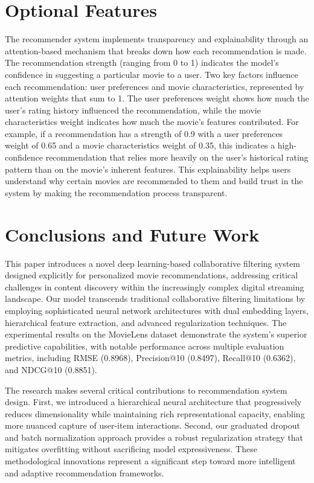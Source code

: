 \documentclass[sigconf]{acmart}
\begin{document}
\section{Optional Features}
The recommender system implements transparency and explainability through an attention-based mechanism that breaks down how each recommendation is made. The recommendation strength (ranging from 0 to 1) indicates the model's confidence in suggesting a particular movie to a user. Two key factors influence each recommendation: user preferences and movie characteristics, represented by attention weights that sum to 1. The user preferences weight shows how much the user's rating history influenced the recommendation, while the movie characteristics weight indicates how much the movie's features contributed. For example, if a recommendation has a strength of 0.9 with a user preferences weight of 0.65 and a movie characteristics weight of 0.35, this indicates a high-confidence recommendation that relies more heavily on the user's historical rating pattern than on the movie's inherent features. This explainability helps users understand why certain movies are recommended to them and build trust in the system by making the recommendation process transparent.

\section{Conclusions and Future Work}\label{sec:conclusions}
This paper introduces a novel deep learning-based collaborative filtering system designed explicitly for personalized movie recommendations, addressing critical challenges in content discovery within the increasingly complex digital streaming landscape. Our model transcends traditional collaborative filtering limitations by employing sophisticated neural network architectures with dual embedding layers, hierarchical feature extraction, and advanced regularization techniques. The experimental results on the MovieLens dataset demonstrate the system's superior predictive capabilities, with notable performance across multiple evaluation metrics, including RMSE (0.8968), Precision@10 (0.8497), Recall@10 (0.6362), and NDCG@10 (0.8851).

The research makes several critical contributions to recommendation system design. First, we introduced a hierarchical neural architecture that progressively reduces dimensionality while maintaining rich representational capacity, enabling more nuanced capture of user-item interactions. Second, our graduated dropout and batch normalization approach provides a robust regularization strategy that mitigates overfitting without sacrificing model expressiveness. These methodological innovations represent a significant step toward more intelligent and adaptive recommendation frameworks.
\end{document}
